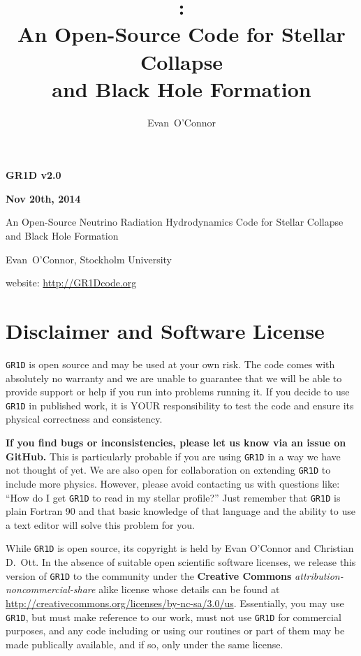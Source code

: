\documentclass[10pt,nofootinbib]{article}
\title{\code{GR1D}:\\ An Open-Source Code for Stellar Collapse\\
 and Black Hole Formation}
\author{Evan\ O'Connor}
\newcommand{\code}[1]{\texttt{#1}}
\begin{document}
\begin{center}
\Large \bf GR1D v2.0 \rm \normalsize

 \bf Nov 20th, 2014 \rm

 \large An Open-Source Neutrino Radiation Hydrodynamics Code for
 Stellar Collapse and Black Hole Formation \normalsize

Evan\ O'Connor, Stockholm University

website: \url{http://GR1Dcode.org}

\end{center}


\section{Disclaimer and Software License}
\code{GR1D} is open source and may be used at your own risk.  The code
comes with absolutely no warranty and we are unable to guarantee that
we will be able to provide support or help if you run into problems
running it. If you decide to use \code{GR1D} in published work, it is
YOUR responsibility to test the code and ensure its physical
correctness and consistency. 

{\bf If you find bugs or inconsistencies, please let us know via an
  issue on GitHub.} This is particularly probable if you are using
\code{GR1D} in a way we have not thought of yet.  We are also open for
collaboration on extending \code{GR1D} to include more
physics. However, please avoid contacting us with questions like:
``How do I get \code{GR1D} to read in my stellar profile?'' Just
remember that \code{GR1D} is plain Fortran 90 and that basic knowledge
of that language and the ability to use a text editor will solve this
problem for you.

While \code{GR1D} is open source, its copyright is held by Evan
O'Connor and Christian D.\ Ott. In the absence of suitable open
scientific software licenses, we release this version of \code{GR1D}
to the community under the {\bf Creative Commons}
\emph{attribution-noncommercial-share} alike license whose details can
be found at
\url{http://creativecommons.org/licenses/by-nc-sa/3.0/us}. Essentially,
you may use \code{GR1D}, but must make reference to our work, must not
use \code{GR1D} for commercial purposes, and any code including or
using our routines or part of them may be made publically available,
and if so, only under the same license.
\end{document}
